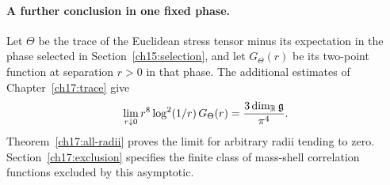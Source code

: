 \paragraph{A further conclusion in one fixed phase.}
Let $\Theta$ be the trace of the Euclidean stress tensor minus its
expectation in the phase selected in Section~\ref{ch15:selection}, and
let $G_\Theta(r)$ be its two-point function at separation $r>0$ in that
phase. The additional estimates of Chapter~\ref{ch17:trace} give
\[
 \lim_{r\downarrow0} r^8\log^2(1/r)\,G_\Theta(r)
     =\frac{3\dim_{\mathbb R}\mathfrak g}{\pi^4}.
\]
Theorem~\ref{ch17:all-radii} proves the limit for arbitrary radii tending
to zero. Section~\ref{ch17:exclusion} specifies the finite class of
mass-shell correlation functions excluded by this asymptotic.
